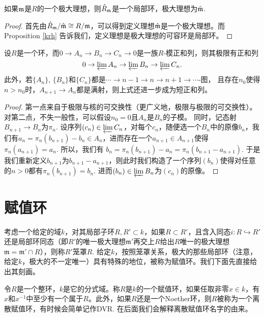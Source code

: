 \begin{pro}
如果$\mathfrak{m}$是$R$的一个极大理想，则$\hat R_{\mathfrak{m}}$是一个局部环，极大理想为$\hat{\mathfrak{m}}$.
\end{pro}

\begin{proof}
	首先由$\hat R_{\mathfrak{m}}/\hat{\mathfrak{m}}\cong R/\mathfrak{m}$，可以得到定义理想$\hat {\mathfrak{m}}$是一个极大理想。而Proposition \ref{krh} 告诉我们，定义理想是极大理想的可容环是局部环。
\end{proof}

\begin{pro}
	设$R$是一个环，而$0\to A_n \to B_n \to C_n \to 0$是一族$R$-模正和列，则其极限有正和列
	\[
		0\to \varprojlim A_n\to \varprojlim B_n\to \varprojlim C_n.
	\]
	此外，若$\{A_n\}$, $\{B_n\}$和$\{C_n\}$都是$\cdots \to n-1 \to  n\to n+1\to \cdots$-图，
	且存在$n_0$使得$n>n_0$时，$A_{n+1}\to A_n$都是满射，则上式还进一步成为短正和列。
\end{pro}

\begin{proof}
	第一点来自于极限与核的可交换性（更广义地，极限与极限的可交换性）。对第二点，不失一般性，可以假设$n_0=0$且$A_n$是$B_n$的子模。
	同时，记态射$B_{n+1}\to B_n$为$\pi_n$.
	设序列$(c_n)\in \varprojlim C_n$，对每个$c_n$，随便选一个$B_n$中的原像$b_n$，我们有$a_n=\pi_n(b_{n+1})-b_n\in A_n$，进而存在一个$a_{n+1}\in A_{n+1}$使得$\pi_n(a_{n+1})=a_n$. 所以，我们有
	$b_n=\pi_n(b_{n+1})-a_n=\pi_n(b_{n+1}-a_{n+1})$. 于是我们重新定义$b_{n+1}$为$b_{n+1}-a_{n+1}$，则此时我们构造了一个序列$(b_n)$使得对任意的$n>0$都有$\pi_n(b_{n+1})=b_n$. 进而$(b_n)\in \varprojlim B_n$为$(c_n)$的原像。
\end{proof}

\section{赋值环}

考虑一个给定的域$k$，对其局部子环$R,R'\subset k$，如果$R\subset R'$，且含入同态$i:R\hookrightarrow R'$还是局部环同态（即$R'$的唯一极大理想$\mathfrak m'$再交上$R$给出$R$唯一的极大理想$\mathfrak m=\mathfrak m'\cap R$），则称$R'$笼罩$R$. 给定$k$，按照笼罩关系，极大的那些局部环（注意，给定$k$，极大的不一定唯一）具有特殊的地位，被称为赋值环。我们下面先直接给出其刻画。

\begin{para}[赋值环]
令$R$是一个整环，$k$是它的分式域。称$R$是$k$的一个赋值环，如果任取非零$x\in k$，有$x$和$x^{-1}$中至少有一个属于$R$。此外，如果$R$还是一个Noether环，则$R$被称为一个离散赋值环，有时候会简单记作DVR. 在后面我们会解释离散赋值环名字的由来。
\end{para}

